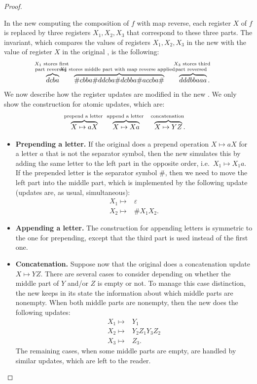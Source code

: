 \begin{proof}
\begin{itemize}
In the new \sst computing the composition of $f$ with map reverse, each register $X$ of $f$ is replaced by three registers $X_1,X_2,X_3$ that correspond to these three parts. The invariant, which compares the values of registers $X_1,X_2,X_3$ in the new \sst with the value of register $X$ in the original \sst, is the following:
\begin{align*}
\myoverbrace{dcba 
}{
    $X_1$ stores first\\ part reversed
}
\qquad
\myoverbrace{\#cbba\#ddcba\#dcbba\#accba\#
}{
    $X_2$ stores middle part with map reverse applied
}
\qquad 
\myoverbrace{dddbbaaa}{
    $X_3$ stores third\\ part reversed
}.
\end{align*}
  We now describe how the register updates are modified in the new \sst. We only show the construction for atomic updates, which are:
 \begin{align*}
 \myoverbrace{X\mapsto  aX}{prepend a letter}
 \qquad 
 \myoverbrace{X\mapsto Xa}{append a letter}
 \qquad 
 \myoverbrace{X\mapsto YZ}{concatenation}.
 \end{align*}

 \begin{itemize}
    \item \textbf{Prepending a letter.} If the original \sst does a prepend operation $X \mapsto  aX$ for a letter $a$ that is not the separator symbol, then the new \sst simulates this by adding the same letter to the left part in the opposite order, i.e.~$X_1 \mapsto  X_1a$. If the prepended letter is the separator symbol $\#$, then we need to move the left part into the middle part, which is implemented by the following update (updates are, as usual, simultaneous): 
    \begin{align*}
    X_1 \mapsto &  \varepsilon \\ 
    X_2 \mapsto  & \# X_1 X_2.
    \end{align*}
    \item \textbf{Appending a letter.} The construction for appending letters is symmetric to the one for prepending, except that the third part is used  instead of the first one.
    \item \textbf{Concatenation.} Suppose now that the original \sst does a concatenation update $X \mapsto  YZ$. There are several cases to consider depending on whether the middle part of $Y$ and/or $Z$ is empty or not. To manage this case distinction, the new \sst keeps in its state the information about which middle parts are nonempty. When both middle parts are nonempty, then the new \sst does the following updates: 
\begin{align*}
X_1 \mapsto & Y_1  \\
X_2 \mapsto & Y_2 Z_1 Y_3 Z_2 \\
X_3 \mapsto & Z_3.
\end{align*}
The remaining cases, when some middle parts are empty, are handled by similar updates, which are left to the reader. 
 \end{itemize}
 

\end{itemize}
\end{proof}
